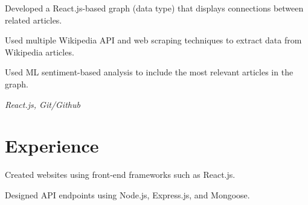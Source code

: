 \documentclass[]{deedy-resume-openfont}
\begin{document}
\begin{minipage}[t]{0.66\textwidth}
\begin{tightemize}

    \item Developed a React.js-based graph (data type) that displays connections between related articles.
    \item Used multiple Wikipedia API and web scraping techniques to extract data from Wikipedia articles.
    \item Used ML sentiment-based analysis to include the most relevant articles in the graph.
\end{tightemize}
\textit{React.js, Git/Github}
\sectionsep


% 



\section{Experience}

\begin{tightemize}
\item Created websites using front-end frameworks such as React.js.
\item Designed API endpoints using Node.js, Express.js, and Mongoose.
\end{tightemize}
\sectionsep


\end{minipage}
\end{document}
